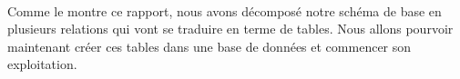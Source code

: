 \paragraph{}{
    Comme le montre ce rapport, nous avons décomposé notre schéma de base en plusieurs relations qui vont se traduire en terme de tables. Nous allons pourvoir maintenant créer ces tables dans une base de données et commencer son exploitation.
}